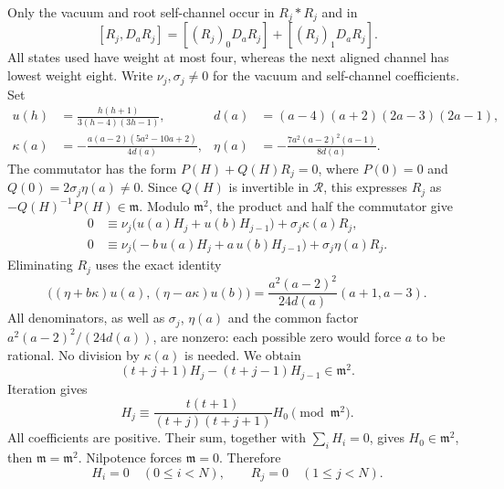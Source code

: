\documentclass[11pt,a4paper]{article}
\numberwithin{equation}{section}
\theoremstyle{definition}\newtheorem{definition}[theorem]{Definition}
\theoremstyle{remark}\newtheorem{remark}[theorem]{Remark}
\begin{document}
Only the vacuum and root self-channel occur in $R_j*R_j$ and in
\[
 [R_j,D_aR_j]=[(R_j)_0D_aR_j]+[(R_j)_1D_aR_j].
\]
All states used have weight at most four, whereas the next aligned channel
has lowest weight eight.  Write $\nu_j,\sigma_j\ne0$ for the vacuum and
self-channel coefficients.  Set
\begin{align*}
 u(h)&=\frac{h(h+1)}{3(h-4)(3h-1)},
 &d(a)&=(a-4)(a+2)(2a-3)(2a-1),\\
 \kappa(a)&=-\frac{a(a-2)(5a^2-10a+2)}{4d(a)},
 &\eta(a)&=-\frac{7a^2(a-2)^2(a-1)}{8d(a)}.
\end{align*}
The commutator has the form $P(H)+Q(H)R_j=0$, where $P(0)=0$
and $Q(0)=2\sigma_j\eta(a)\ne0$.  Since $Q(H)$ is invertible
in $\mathcal R$, this expresses $R_j$ as
$-Q(H)^{-1}P(H)\in\mathfrak m$.
Modulo $\mathfrak m^2$, the product and half the commutator give
\begin{align*}
 0&\equiv\nu_j\bigl(u(a)H_j+u(b)H_{j-1}\bigr)
             +\sigma_j\kappa(a)R_j,\\
 0&\equiv\nu_j\bigl(-b\,u(a)H_j+a\,u(b)H_{j-1}\bigr)
             +\sigma_j\eta(a)R_j.
\end{align*}
Eliminating $R_j$ uses the exact identity
\[
 \bigl((\eta+b\kappa)u(a),(\eta-a\kappa)u(b)\bigr)
 =\frac{a^2(a-2)^2}{24d(a)}(a+1,a-3).
\]
All denominators, as well as $\sigma_j$, $\eta(a)$ and the common
factor $a^2(a-2)^2/(24d(a))$, are nonzero: each possible zero would
force $a$ to be rational.  No division by $\kappa(a)$ is needed.
We obtain
\begin{equation}
 (t+j+1)H_j-(t+j-1)H_{j-1}\in\mathfrak m^2.
 \label{r:eq:h0-recurrence}
\end{equation}
Iteration gives
\[
 H_j\equiv\frac{t(t+1)}{(t+j)(t+j+1)}H_0\pmod{\mathfrak m^2}.
\]
All coefficients are positive.  Their sum, together with $\sum_iH_i=0$,
gives $H_0\in\mathfrak m^2$, then $\mathfrak m=\mathfrak m^2$.
Nilpotence forces $\mathfrak m=0$.  Therefore
\begin{equation}
 H_i=0\quad(0\leq i<N),\qquad R_j=0\quad(1\leq j<N).
 \label{r:eq:h0-frame-zero}
\end{equation}
\end{document}
